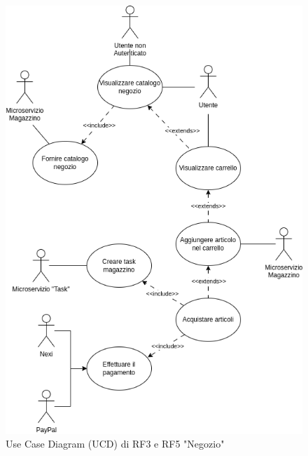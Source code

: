 \documentclass{report}
\begin{document}
\begin{figure}[H]
	\centering\includegraphics[width=1\textwidth]{images/UCD/RF3+5_negozio_UCD.png}
	Use Case Diagram (UCD) di RF3 e RF5 "Negozio"
\end{figure}
\end{document}
